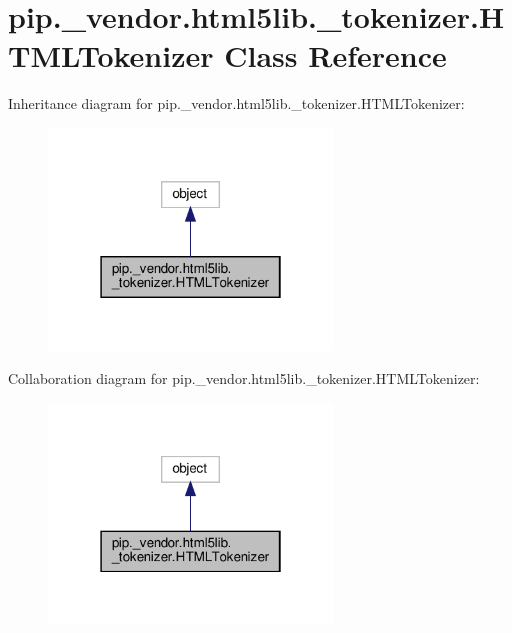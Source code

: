 \hypertarget{classpip_1_1__vendor_1_1html5lib_1_1__tokenizer_1_1HTMLTokenizer}{}\section{pip.\+\_\+vendor.\+html5lib.\+\_\+tokenizer.\+H\+T\+M\+L\+Tokenizer Class Reference}
\label{classpip_1_1__vendor_1_1html5lib_1_1__tokenizer_1_1HTMLTokenizer}


Inheritance diagram for pip.\+\_\+vendor.\+html5lib.\+\_\+tokenizer.\+H\+T\+M\+L\+Tokenizer\+:
\nopagebreak
\begin{figure}[H]
\begin{center}
\leavevmode
\includegraphics[width=214pt]{classpip_1_1__vendor_1_1html5lib_1_1__tokenizer_1_1HTMLTokenizer__inherit__graph}
\end{center}
\end{figure}


Collaboration diagram for pip.\+\_\+vendor.\+html5lib.\+\_\+tokenizer.\+H\+T\+M\+L\+Tokenizer\+:
\nopagebreak
\begin{figure}[H]
\begin{center}
\leavevmode
\includegraphics[width=214pt]{classpip_1_1__vendor_1_1html5lib_1_1__tokenizer_1_1HTMLTokenizer__coll__graph}
\end{center}
\end{figure}
